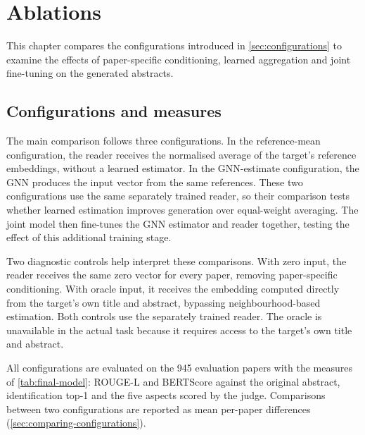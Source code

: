 \chapter{Ablations}
\label{chap:ablations}

This chapter compares the configurations introduced in \autoref{sec:configurations} to examine the effects of paper-specific conditioning, learned aggregation and joint fine-tuning on the generated abstracts.

\section{Configurations and measures}
\label{sec:ablation-setup}

The main comparison follows three configurations. In the reference-mean configuration, the reader receives the normalised average of the target's reference embeddings, without a learned estimator. In the GNN-estimate configuration, the GNN produces the input vector from the same references. These two configurations use the same separately trained reader, so their comparison tests whether learned estimation improves generation over equal-weight averaging. The joint model then fine-tunes the GNN estimator and reader together, testing the effect of this additional training stage.

Two diagnostic controls help interpret these comparisons. With zero input, the reader receives the same zero vector for every paper, removing paper-specific conditioning. With oracle input, it receives the embedding computed directly from the target's own title and abstract, bypassing neighbourhood-based estimation. Both controls use the separately trained reader. The oracle is unavailable in the actual task because it requires access to the target's own title and abstract.

All configurations are evaluated on the 945 evaluation papers with the measures of \autoref{tab:final-model}: ROUGE-L and BERTScore against the original abstract, identification top-1 and the five aspects scored by the judge. Comparisons between two configurations are reported as mean per-paper differences (\autoref{sec:comparing-configurations}).

